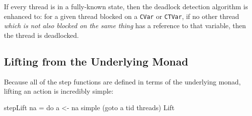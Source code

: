 If every thread is in a fully-known state, then the deadlock detection
algorithm is enhanced to: for a given thread blocked on a \verb|CVar|
or \verb|CTVar|, if no other thread \emph{which is not also blocked on
  the same thing} has a reference to that variable, then the thread is
deadlocked.

\subsection{Lifting from the Underlying Monad}
\label{sec:execution-stepwise-lift}

Because all of the step functions are defined in terms of the
underlying monad, lifting an action is incredibly simple:

\begin{haskellcode}
stepLift na = do
  a <- na
  simple (goto a tid threads) Lift
\end{haskellcode}
